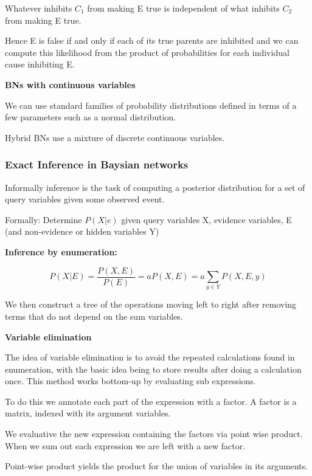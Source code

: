 \documentclass{article}
\begin{document}
Whatever inhibits $C_1$ from making E true is independent of what inhibits $C_2$ from making E true.

Hence E is false if and only if each of its true parents are inhibited and we can compute this likelihood from the product of probabilities for each individual cause inhibiting E. \newline

\textbf{BNs with continuous variables} \newline

We can use standard families of probability distributions defined in terms of a few parameters such as a normal distribution. 

Hybrid BNs use a mixture of discrete continuous variables.

\subsubsection{Exact Inference in Baysian networks}

Informally inference is the task of computing a posterior distribution for a set of query variables given some observed event. \newline

Formally: Determine $P(X|e)$ given query variables X, evidence variables, E (and non-evidence or hidden variables Y) \newline

\textbf{Inference by enumeration:}

$$P(X | E) = \frac{P(X, E)}{P(E)} = a P (X, E) = a \sum_{y \in Y} P(X, E, y)$$ 

We then construct a tree of the operations moving left to right after removing terms that do not depend on the sum variables.

\textbf{Variable elimination}

The idea of variable elimination is to avoid the repeated calculations found in enumeration, with the basic idea being to store results after doing a calculation once. This method works bottom-up by evaluating sub expressions.

To do this we annotate each part of the expression with a factor. A factor is a matrix, indexed with its argument variables.

We evaluative the new expression containing the factors via point wise product. When we sum out each expression we are left with a new factor. 

Point-wise product yields the product for the union of variables in its arguments.
\end{document}
